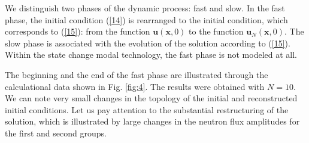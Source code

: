 \documentclass[a4paper]{jpconf}
\begin{document}
We distinguish two phases of the dynamic process: fast and slow. In the fast phase, the initial condition (\ref{14}) 
is rearranged to the initial condition, which corresponds to (\ref{15}): from the function
$\bm u(\bm x, 0)$ to the function $\bm u_N(\bm x, 0)$. The slow phase is associated with the evolution of the solution according to (\ref{15}).
Within the state change modal technology, the fast phase is not modeled at all.

The beginning and the end of the fast phase are illustrated through the calculational data shown in Fig. \ref{fig:4}. The results were obtained with $N=10$. We can note very small changes in the topology of the initial and reconstructed initial conditions. Let us pay attention to the substantial restructuring of the solution, which is illustrated by large changes in the neutron flux amplitudes for the first and second groups.
\end{document}
